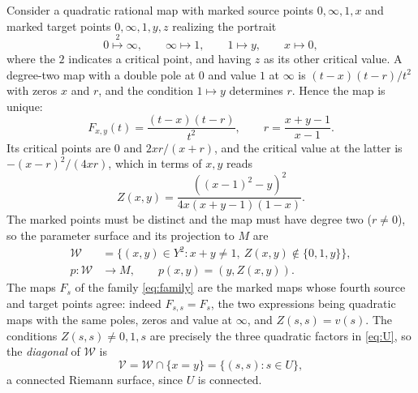 \documentclass[11pt]{article}
\newcommand{\W}{\mathcal W}
\newcommand{\V}{\mathcal V}
\theoremstyle{remark}
\numberwithin{equation}{section}
\begin{document}
Consider a quadratic rational map with marked source points $0,\infty,1,x$
and marked target points $0,\infty,1,y,z$ realizing the portrait
\begin{equation}\label{eq:portrait}
 0\stackrel{2}{\longmapsto}\infty,\qquad
 \infty\longmapsto1,\qquad 1\longmapsto y,\qquad
 x\longmapsto0,
\end{equation}
where the $2$ indicates a critical point, and having $z$ as its other
critical value. A degree-two map with a double pole at $0$ and value $1$ at
$\infty$ is $(t-x)(t-r)/t^2$ with zeros $x$ and $r$, and the condition
$1\mapsto y$ determines $r$. Hence the map is unique:
\begin{equation}\label{eq:Fxy}
 F_{x,y}(t)=\frac{(t-x)(t-r)}{t^2},
 \qquad r=\frac{x+y-1}{x-1}.
\end{equation}
Its critical points are $0$ and $2xr/(x+r)$, and the critical value at the
latter is $-(x-r)^2/(4xr)$, which in terms of $x,y$ reads
\begin{equation}\label{eq:Z}
 Z(x,y)=\frac{((x-1)^2-y)^2}{4x(x+y-1)(1-x)} .
\end{equation}
The marked points must be distinct and the map must have degree two
($r\ne0$), so the parameter surface and its projection to $M$ are
\begin{align}
 \W&=\{(x,y)\in Y^2:x+y\ne1,\ Z(x,y)\notin\{0,1,y\}\},
 \label{eq:W}\\
 p\colon\W&\longrightarrow M,\qquad p(x,y)=(y,Z(x,y)).
 \label{eq:p}
\end{align}
The maps $F_s$ of the family \eqref{eq:family} are the marked maps whose
fourth source and target points agree: indeed $F_{s,s}=F_s$, the two
expressions being quadratic maps with the same poles, zeros and value at
$\infty$, and $Z(s,s)=v(s)$. The conditions $Z(s,s)\ne0,1,s$ are precisely
the three quadratic factors in \eqref{eq:U}, so the \emph{diagonal} of
$\W$ is
\begin{equation}\label{eq:V}
 \V=\W\cap\{x=y\}=\{(s,s):s\in U\},
\end{equation}
a connected Riemann surface, since $U$ is connected.
\end{document}
